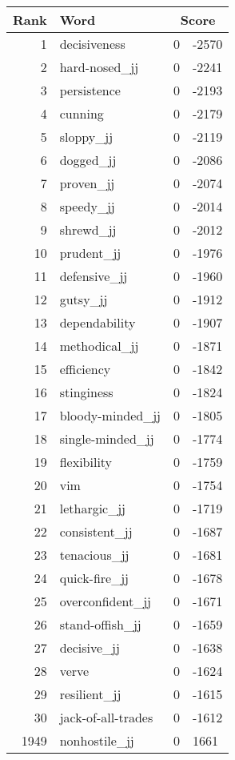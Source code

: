 \begin{longtable}[!htbp]{| rlr@{.}l |}
    \hline
    \textbf{Rank} & \textbf{Word} & \multicolumn{2}{c|}{\textbf{Score}} \\
    \hline
    \endhead
    1 & decisiveness & 0 & -2570 \\
    2 & hard-nosed\_jj & 0 & -2241 \\
    3 & persistence & 0 & -2193 \\
    4 & cunning & 0 & -2179 \\
    5 & sloppy\_jj & 0 & -2119 \\
    6 & dogged\_jj & 0 & -2086 \\
    7 & proven\_jj & 0 & -2074 \\
    8 & speedy\_jj & 0 & -2014 \\
    9 & shrewd\_jj & 0 & -2012 \\
    10 & prudent\_jj & 0 & -1976 \\
    11 & defensive\_jj & 0 & -1960 \\
    12 & gutsy\_jj & 0 & -1912 \\
    13 & dependability & 0 & -1907 \\
    14 & methodical\_jj & 0 & -1871 \\
    15 & efficiency & 0 & -1842 \\
    16 & stinginess & 0 & -1824 \\
    17 & bloody-minded\_jj & 0 & -1805 \\
    18 & single-minded\_jj & 0 & -1774 \\
    19 & flexibility & 0 & -1759 \\
    20 & vim & 0 & -1754 \\
    21 & lethargic\_jj & 0 & -1719 \\
    22 & consistent\_jj & 0 & -1687 \\
    23 & tenacious\_jj & 0 & -1681 \\
    24 & quick-fire\_jj & 0 & -1678 \\
    25 & overconfident\_jj & 0 & -1671 \\
    26 & stand-offish\_jj & 0 & -1659 \\
    27 & decisive\_jj & 0 & -1638 \\
    28 & verve & 0 & -1624 \\
    29 & resilient\_jj & 0 & -1615 \\
    30 & jack-of-all-trades & 0 & -1612 \\
    1949 & nonhostile\_jj & 0 & 1661 \\

\end{longtable}

